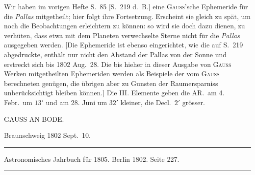 Wir haben im vorigen Hefte S.\ 85 [S.\ 219 d.\ B.] eine \textsc{Gauss}'sche Ephemeride für die \textit{Pallas} mitgetheilt; hier folgt ihre Fortsetzung. Erscheint sie gleich zu spät, um noch die Beobachtungen erleichtern zu können: so wird sie doch dazu dienen, zu verhüten, dass etwa mit dem Planeten verwechselte Sterne nicht für die \textit{Pallas} ausgegeben werden. [Die Ephemeride ist ebenso eingerichtet, wie die auf S.\ 219 abgedruckte, enthält nur nicht den Abstand der Pallas von der Sonne und erstreckt sich bis 1802 Aug.\ 28. Die bis hieher in dieser Ausgabe von \textsc{Gauss} Werken mitgetheilten Ephemeriden werden als Beispiele der vom \textsc{Gauss} berechneten genügen, die übrigen aber zu Gunsten der Raumersparniss unberücksichtigt bleiben können.]
\expandafter\def\csname HistoricalNoteText21\endcsname{Die III. Elemente geben die AR.\ am 4. Febr.\ um $13'$ und am 28. Juni um $32'$ kleiner, die Decl.\ $2'$ grösser.}
%
\bigskip{}
\begin{center}GAUSS AN BODE.\end{center}
\begin{flushright}Braunschweig 1802 Sept.\ 10.\end{flushright}
\begin{center}
\medskip\hrule\medskip
Astronomisches Jahrbuch für 1805. Berlin 1802. Seite 227.\par
\medskip\hrule
\end{center}\medskip

